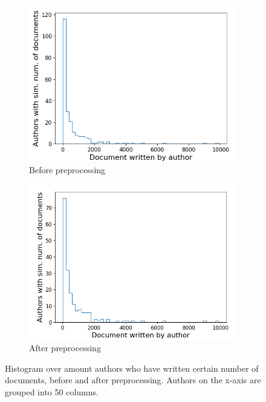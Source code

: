 \begin{figure}[b]
	\centering
	\begin{subfigure}{0.45\textwidth}
		\centering
		\includegraphics[width=\linewidth]{figures/author_hist2_before.png}
		\caption{Before preprocessing}
		\label{fig:author_hist_before}
	\end{subfigure}
	\begin{subfigure}{0.45\textwidth}
		\centering
		\includegraphics[width=\linewidth]{figures/author_hist2_14.png}
		\caption{After preprocessing}
		\label{fig:auhtor_hist_after}
	\end{subfigure}
	\caption{Histogram over amount authors who have written certain number of documents, before and after preprocessing.
		Authors on the x-axis are grouped into 50 columns.}
	\label{fig:author_hist}
\end{figure}

